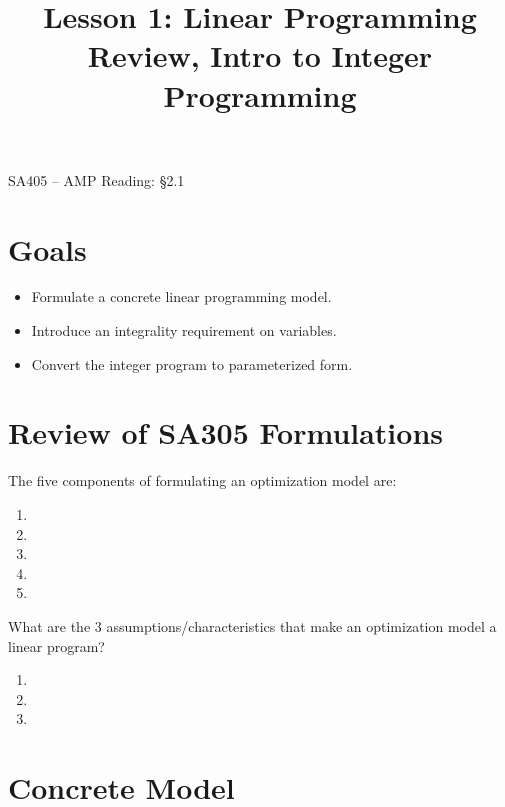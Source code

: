\documentclass[12pt]{article}
\makeatletter
\theoremstyle{definition}
\newcommand{\graphbox}[5]%
{
\begin{tikzpicture}
     [>=latex,scale=#5]
     
     \draw [->,very thick] (#1, 0) -- (#2, 0) node[right] {$x$};
     \draw [->,very thick] (0, #3) -- (0, #4) node[above] {$y$};
     
     \draw[step=1cm,thick,dotted] (#1,#3) grid (#2,#4);
   \end{tikzpicture}
   }
\renewcommand{\maketitle}{
  \noindent SA405 -- AMP \hfill  Reading: \S 2.1 \\

  \begin{center}\Large{\textbf{\@title}}\end{center}
}
\makeatother
\begin{document}

\title{Lesson 1: Linear Programming Review, Intro to Integer Programming}


\maketitle

\section{Goals}
\begin{itemize}
\item  Formulate a concrete linear programming model.
\item  Introduce an integrality requirement on variables.
\item  Convert the integer program to parameterized form.
\end{itemize}

\section{Review of SA305 Formulations}

The five components of formulating an optimization model are:

\begin{enumerate}
\item \phantom{a} 
\item \phantom{a} \vspace{0.75in}
\item \phantom{a} \vspace{0.75in}
\item \phantom{a} \vspace{0.75in}
\item \phantom{a} \vspace{0.75in}
\end{enumerate}

\newpage

What are the 3 assumptions/characteristics that make an optimization model a linear program?
\begin{enumerate}
\item \phantom{a}
\item \phantom{a}
\item \phantom{a}
\end{enumerate}


\section{Concrete Model}
\end{document}
